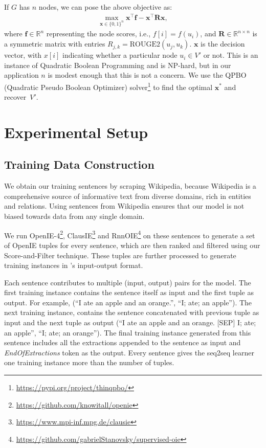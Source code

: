         If $G$ has $n$ nodes, we can pose the above objective as:
        \begin{align}
        \max_{\bm{x} \in \{0,1\}^{n}}  \bm{x}^\top \bm{f} - \bm{x}^\top \bm{R} \bm{x},
        \end{align}
        where $\bm{f} \in \mathbb{R}^n$ representing the node scores, i.e., $f[i]=f(u_{i})$, and
        $\bm{R} \in \mathbb{R}^{n\times n}$ is a symmetric matrix with entries $R_{j,k}=\text{ROUGE2}(u_{j},u_{k})$.
        $\bm{x}$ is the decision vector, with $x[i]$ indicating whether a particular node $u_i \in V'$ or not. This is an instance of Quadratic Boolean Programming and is NP-hard, but in our application $n$ is modest enough that this is not a concern.  We use the QPBO (Quadratic Pseudo Boolean Optimizer) solver\footnote{\href{https://pypi.org/project/thinqpbo/}{https://pypi.org/project/thinqpbo/}} \cite{Rother2007OptimizingBM} to find the optimal $\bm{x}^*$ and recover~$V'$.

\section{Experimental Setup}
    \subsection{Training Data Construction}

        We obtain our training sentences by scraping Wikipedia, because Wikipedia is a comprehensive source of informative text from diverse domains, rich in entities and relations.  
        Using sentences from Wikipedia ensures that our model is not biased towards data from any single domain.

        We run OpenIE-4\footnote{\href{https://github.com/knowitall/openie}{https://github.com/knowitall/openie}}, ClausIE\footnote{\href{https://www.mpi-inf.mpg.de/departments/databases-and-information-systems/software/clausie}{https://www.mpi-inf.mpg.de/clausie}} and RnnOIE\footnote{\href{https://github.com/gabrielStanovsky/supervised-oie}{https://github.com/gabrielStanovsky/supervised-oie}} on these sentences to generate a set of OpenIE tuples for every sentence, which are then ranked and filtered using our Score-and-Filter technique. 
        These tuples are further processed to generate training instances in \shortname's input-output format. 

        Each sentence contributes to multiple (input, output) pairs for the \shortname{} model. The first training instance contains the sentence itself as input and the first tuple as output. For example, (``I ate an apple and an orange.'', ``I; ate; an apple''). The next training instance, contains the sentence concatenated with previous tuple as input and the next tuple as output (``I ate an apple and an orange. [SEP] I; ate; an apple'',  ``I; ate; an orange''). The final training instance generated from this sentence includes all the extractions appended to the sentence as input and \textit{EndOfExtractions} token as the output. Every sentence gives the seq2seq learner one training instance more than the number of tuples. 

